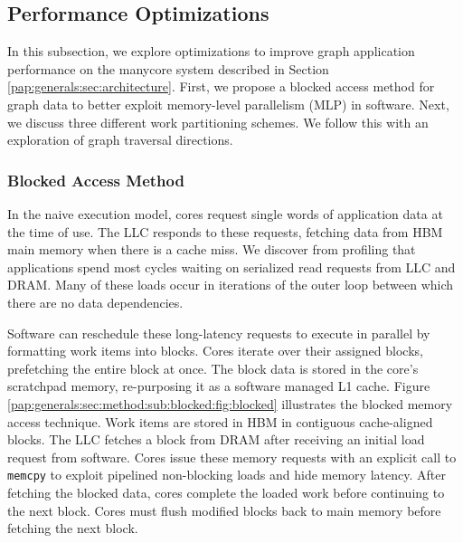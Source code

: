 

\subsection{Performance Optimizations} \label{sec:method}

In this subsection, we explore optimizations to improve graph application performance on the manycore system described in Section \ref{pap:generals:sec:architecture}.
First, we propose a blocked access method for graph data to better exploit memory-level parallelism (MLP) in software.
Next, we discuss three different work partitioning schemes.
We follow this with an exploration of graph traversal directions.

\subsubsection{Blocked Access Method}\label{sec:method:sub:blocked}
In the naive execution model, cores request single words of application data at the time of use.
The LLC responds to these requests, fetching data from HBM main memory when there is a cache miss.
We discover from profiling that applications spend most cycles waiting on serialized read requests from LLC and DRAM.
Many of these loads occur in iterations of the outer loop between which there are no data dependencies.

\blockedMethodFigure

Software can reschedule these long-latency requests to execute in parallel by formatting work items into blocks.
Cores iterate over their assigned blocks, prefetching the entire block at once.
The block data is stored in the core's scratchpad memory, re-purposing it as a software managed L1 cache.
Figure \ref{pap:generals:sec:method:sub:blocked:fig:blocked} illustrates the blocked memory access technique. 
Work items are stored in HBM in contiguous cache-aligned blocks.
The LLC fetches a block from DRAM after receiving an initial load request from software.
Cores issue these memory requests with an explicit call to \lstinline[language=C++, basicstyle=\small\ttfamily]{memcpy} to exploit pipelined non-blocking loads and hide memory latency.
After fetching the blocked data, cores complete the loaded work before continuing to the next block.
Cores must flush modified blocks back to main memory before fetching the next block.


